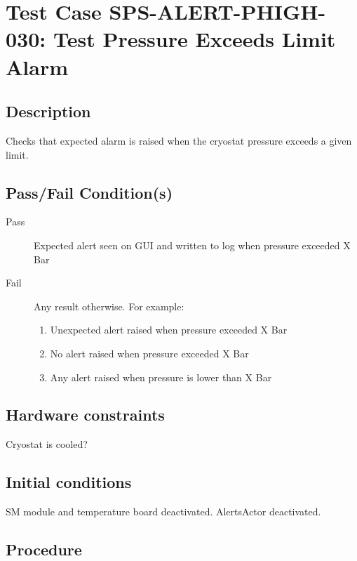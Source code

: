 \section{Test Case SPS-ALERT-PHIGH-030: Test Pressure Exceeds Limit Alarm}

\subsection{Description}

Checks that expected alarm is raised when the cryostat pressure exceeds a given limit.

\subsection{Pass/Fail Condition(s)}

\begin{description}
\item [Pass] Expected alert seen on GUI and written to log when pressure exceeded X Bar
\item [Fail] Any result otherwise. For example:

\begin{enumerate}
    \item Unexpected alert raised when pressure exceeded X Bar
    \item No alert raised when pressure exceeded X Bar
    \item Any alert raised when pressure is lower than X Bar
\end{enumerate}
\end{description}

\subsection{Hardware constraints}

Cryostat is cooled?

\subsection{Initial conditions}

SM module and temperature board deactivated. AlertsActor deactivated.

\subsection{Procedure}

